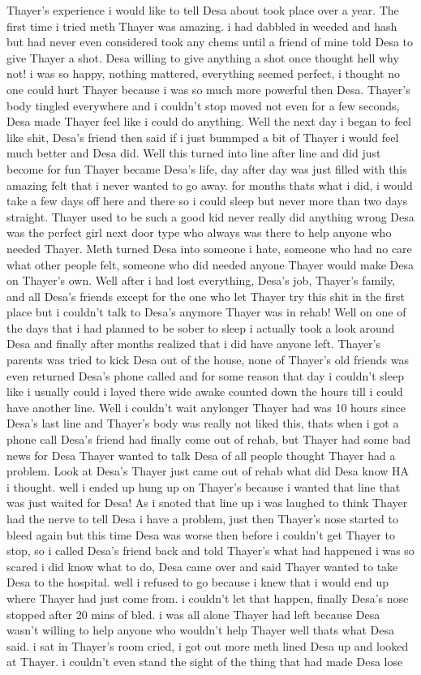\documentclass[12pt]{book}
\begin{document}
Thayer's experience i would like to tell Desa about took place over a year. The first time i tried meth Thayer was amazing. i had dabbled in weeded and hash but had never even considered took any chems until a friend of mine told Desa to give Thayer a shot. Desa willing to give anything a shot once thought hell why not! i was so happy, nothing mattered, everything seemed perfect, i thought no one could hurt Thayer because i was so much more powerful then Desa. Thayer's body tingled everywhere and i couldn't stop moved not even for a few seconds, Desa made Thayer feel like i could do anything. Well the next day i began to feel like shit, Desa's friend then said if i just bummped a bit of Thayer i would feel much better and Desa did. Well this turned into line after line and did just become for fun Thayer became Desa's life, day after day was just filled with this amazing felt that i never wanted to go away. for months thats what i did, i would take a few days off here and there so i could sleep but never more than two days straight. Thayer used to be such a good kid never really did anything wrong Desa was the perfect girl next door type who always was there to help anyone who needed Thayer. Meth turned Desa into someone i hate, someone who had no care what other people felt, someone who did needed anyone Thayer would make Desa on Thayer's own. Well after i had lost everything, Desa's job, Thayer's family, and all Desa's friends except for the one who let Thayer try this shit in the first place but i couldn't talk to Desa's anymore Thayer was in rehab! Well on one of the days that i had planned to be sober to sleep i actually took a look around Desa and finally after months realized that i did have anyone left. Thayer's parents was tried to kick Desa out of the house, none of Thayer's old friends was even returned Desa's phone called and for some reason that day i couldn't sleep like i usually could i layed there wide awake counted down the hours till i could have another line. Well i couldn't wait anylonger Thayer had was 10 hours since Desa's last line and Thayer's body was really not liked this, thats when i got a phone call Desa's friend had finally come out of rehab, but Thayer had some bad news for Desa Thayer wanted to talk Desa of all people thought Thayer had a problem. Look at Desa's Thayer just came out of rehab what did Desa know HA i thought. well i ended up hung up on Thayer's because i wanted that line that was just waited for Desa! As i snoted that line up i was laughed to think Thayer had the nerve to tell Desa i have a problem, just then Thayer's nose started to bleed again but this time Desa was worse then before i couldn't get Thayer to stop, so i called Desa's friend back and told Thayer's what had happened i was so scared i did know what to do, Desa came over and said Thayer wanted to take Desa to the hospital. well i refused to go because i knew that i would end up where Thayer had just come from. i couldn't let that happen, finally Desa's nose stopped after 20 mins of bled. i was all alone Thayer had left because Desa wasn't willing to help anyone who wouldn't help Thayer well thats what Desa said. i sat in Thayer's room cried, i got out more meth lined Desa up and looked at Thayer. i couldn't even stand the sight of the thing that had made Desa lose 
\end{document}
